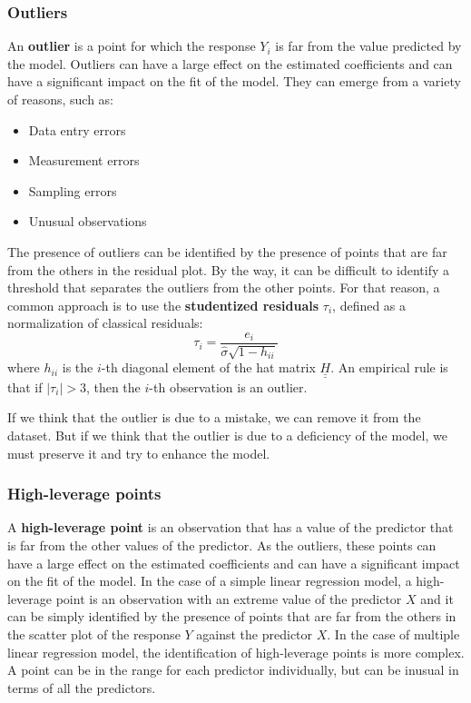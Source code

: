 \subsubsection*{Outliers}
An \textbf{outlier} is a point for which the response $Y_i$ is far from the value predicted by the model. Outliers can have a large effect on the estimated coefficients and can have a significant impact on the fit of the model.
They can emerge from a variety of reasons, such as:
\begin{itemize}
    \item Data entry errors
    \item Measurement errors
    \item Sampling errors
    \item Unusual observations
\end{itemize}
The presence of outliers can be identified by the presence of points that are far from the others in the residual plot. By the way, it can be difficult to identify a threshold that separates the outliers from the other points. For that reason, a common approach is to use the \textbf{studentized residuals} $\tau_i$, defined as a normalization of classical residuals:
\[
    \tau_i = \frac{e_i}{\hat{\sigma}\sqrt{1-h_{ii}}}
\]
where $h_{ii}$ is the $i$-th diagonal element of the hat matrix $\underline {\underline H}$. An empirical rule is that if $|\tau_i| > 3$, then the $i$-th observation is an outlier.

If we think that the outlier is due to a mistake, we can remove it from the dataset. But if we think that the outlier is due to a deficiency of the model, we must preserve it and try to enhance the model.
\subsubsection*{High-leverage points}
A \textbf{high-leverage point} is an observation that has a value of the predictor that is far from the other values of the predictor. As the outliers, these points can have a large effect on the estimated coefficients and can have a significant impact on the fit of the model.
In the case of a simple linear regression model, a high-leverage point is an observation with an extreme value of the predictor $X$ and it can be simply identified by the presence of points that are far from the others in the scatter plot of the response $Y$ against the predictor $X$.
In the case of multiple linear regression model, the identification of high-leverage points is more complex. A point can be in the range for each predictor individually, but can be inusual in terms of all the predictors.

